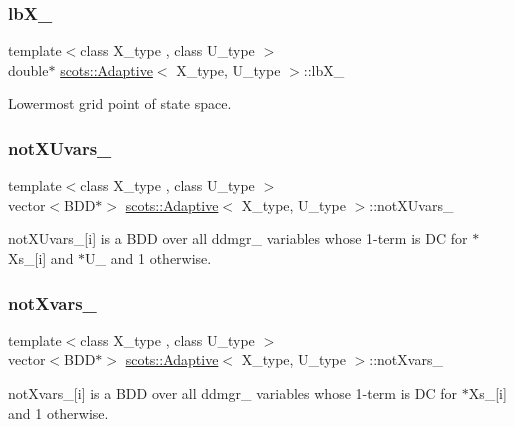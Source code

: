 \subsubsection{\texorpdfstring{lb\+X\+\_\+}{lbX\_}}
{\footnotesize\ttfamily template$<$class X\+\_\+type , class U\+\_\+type $>$ \\
double$\ast$ \hyperlink{classscots_1_1Adaptive}{scots\+::\+Adaptive}$<$ X\+\_\+type, U\+\_\+type $>$\+::lb\+X\+\_\+}

Lowermost grid point of state space. \mbox{\label{classscots_1_1Adaptive_ac3f203003011bcea5176ef294ab7a8a0}} 
\subsubsection{\texorpdfstring{not\+X\+Uvars\+\_\+}{notXUvars\_}}
{\footnotesize\ttfamily template$<$class X\+\_\+type , class U\+\_\+type $>$ \\
vector$<$B\+DD$\ast$$>$ \hyperlink{classscots_1_1Adaptive}{scots\+::\+Adaptive}$<$ X\+\_\+type, U\+\_\+type $>$\+::not\+X\+Uvars\+\_\+}

not\+X\+Uvars\+\_\+\mbox{[}i\mbox{]} is a B\+DD over all ddmgr\+\_\+ variables whose 1-\/term is DC for $\ast$\+Xs\+\_\+\mbox{[}i\mbox{]} and $\ast$\+U\+\_\+ and 1 otherwise. \mbox{\label{classscots_1_1Adaptive_a8fbbf6976e589506c9e4c38045196c07}} 
\subsubsection{\texorpdfstring{not\+Xvars\+\_\+}{notXvars\_}}
{\footnotesize\ttfamily template$<$class X\+\_\+type , class U\+\_\+type $>$ \\
vector$<$B\+DD$\ast$$>$ \hyperlink{classscots_1_1Adaptive}{scots\+::\+Adaptive}$<$ X\+\_\+type, U\+\_\+type $>$\+::not\+Xvars\+\_\+}

not\+Xvars\+\_\+\mbox{[}i\mbox{]} is a B\+DD over all ddmgr\+\_\+ variables whose 1-\/term is DC for $\ast$\+Xs\+\_\+\mbox{[}i\mbox{]} and 1 otherwise. \mbox{\label{classscots_1_1Adaptive_afdd5a499494efeb8538346ad9e0f329c}} 

